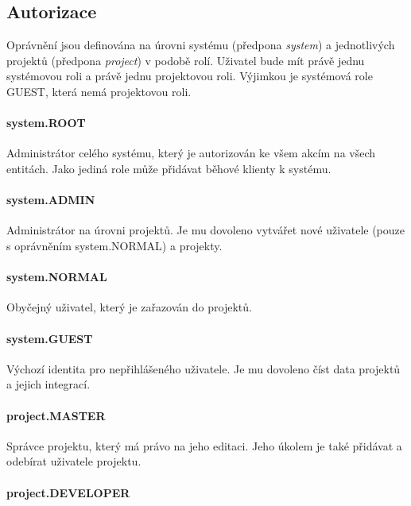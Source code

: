 \subsection{Autorizace}

Oprávnění jsou definována na úrovni systému (předpona \textit{system}) a jednotlivých projektů (předpona \textit{project}) v podobě rolí.
Uživatel bude mít právě jednu systémovou roli a právě jednu projektovou roli.
Výjimkou je systémová role GUEST, která nemá projektovou roli.

\paragraph{system.ROOT}

Administrátor celého systému, který je autorizován ke všem akcím na všech entitách.
Jako jediná role může přidávat běhové klienty k systému.

\paragraph{system.ADMIN}

Administrátor na úrovni projektů.
Je mu dovoleno vytvářet nové uživatele (pouze s oprávněním system.NORMAL) a projekty.

\paragraph{system.NORMAL}

Obyčejný uživatel, který je zařazován do projektů.

\paragraph{system.GUEST}

Výchozí identita pro nepřihlášeného uživatele.
Je mu dovoleno číst data projektů a jejich integrací.

\paragraph{project.MASTER}

Správce projektu, který má právo na jeho editaci.
Jeho úkolem je také přidávat a odebírat uživatele projektu.

\paragraph{project.DEVELOPER}

